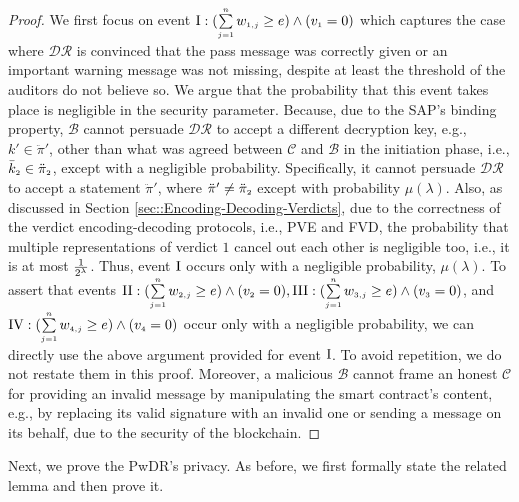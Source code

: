 \vspace{-4mm}
\begin{proof}
%
We first focus on event $\text{\MakeUppercase{\romannumeral 1}}:  (\sum\limits_{\st j=1}^{\st n}w_{\st 1,j}\geq e) \wedge ( v_{\st 1}=0)$ which captures the case where  $\mathcal{DR}$ is convinced that the pass message was correctly given or an important warning message was not missing, despite at least the threshold of the auditors do not believe so. We argue that the probability that this event takes place is negligible in the security parameter. Because, due to the SAP's binding property, $\mathcal{B}$  cannot persuade $\mathcal{DR}$ to accept a different decryption key, e.g., $k'\in \ddot\pi'$, other than what was agreed between $\mathcal{C}$ and $\mathcal{B}$ in the initiation phase, i.e., $\bar k_{\scriptscriptstyle 2}\in \ddot\pi_{\scriptscriptstyle 2}$, except with a negligible probability. Specifically, it cannot persuade  $\mathcal{DR}$ to accept a statement $\ddot \pi'$, where $\ddot \pi'\neq \ddot \pi_{\scriptscriptstyle 2}$ except with   probability $\mu(\lambda)$. Also, as discussed in Section \ref{sec::Encoding-Decoding-Verdicts}, due to the correctness of the verdict encoding-decoding protocols, i.e., PVE and FVD, the probability that multiple representations of verdict  $1$ cancel out each other is negligible too, i.e., it is at most $\frac{1}{2^{\scriptscriptstyle \lambda}}$. Thus,  event $\text{\MakeUppercase{\romannumeral 1}}$ occurs only with a negligible probability, $\mu(\lambda)$. To  assert that   events $\text{\MakeUppercase{\romannumeral 2}}: ( \sum\limits_{\st j=1}^{\st n}w_{\st 2,j}\geq e) \wedge ( v_{\st 2}=0), \text{\MakeUppercase{\romannumeral 3}}: ( \sum\limits_{\st j=1}^{\st n}w_{\st 3,j}\geq e) \wedge ( v_{\st 3}=0)$, and $\text{\MakeUppercase{\romannumeral 4}}: ( \sum\limits_{\st j=1}^{\st n}w_{\st 4,j}\geq e) \wedge ( v_{\st 4}=0)$ occur only with a  negligible probability, we can directly use the above argument provided for event $\text{\MakeUppercase{\romannumeral 1}}$. To avoid repetition, we do not restate them in this proof.  Moreover, a malicious $\mathcal{B}$ cannot frame an honest $\mathcal{C}$ for providing an invalid message by manipulating the smart contract’s content,  e.g., by replacing its valid signature with an invalid one or sending a message on its behalf, due to the security of the blockchain.
\end{proof}

\vspace{-2mm}
Next, we prove the PwDR's privacy. As before, we first formally state the related lemma and then prove it. 

